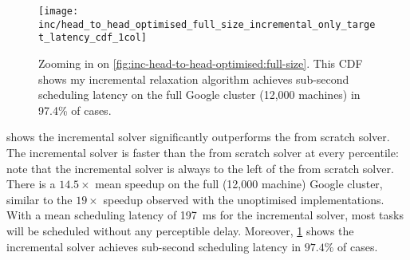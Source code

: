 %

\begin{figure}
    \texttt{[image: inc/head\_to\_head\_optimised\_full\_size\_incremental\_only\_target\_latency\_cdf\_1col]}
    \caption[Performance of my incremental algorithm on the full Google cluster]{Zooming in on \cref{fig:inc-head-to-head-optimised:full-size}. This CDF shows my incremental relaxation algorithm achieves sub-second scheduling latency on the full Google cluster (12,000 machines) in 97.4\% of cases.}
    \label{fig:inc-head-to-head-optimised-inconly}
\end{figure}

 shows the incremental solver significantly outperforms the from scratch solver. The incremental solver is faster than the from scratch solver at every percentile: note that the incremental solver is always to the left of the from scratch solver. There is a $14.5\times$ mean speedup on the full (12,000 machine) Google cluster, similar to the $19\times$ speedup observed with the unoptimised implementations\footnotemark. With a mean scheduling latency of \SI{197}{\milli\second} for the incremental solver, most tasks will be scheduled without any perceptible delay. Moreover, \cref{fig:inc-head-to-head-optimised-inconly} shows the incremental solver achieves sub-second scheduling latency in $97.4\%$ of cases.

